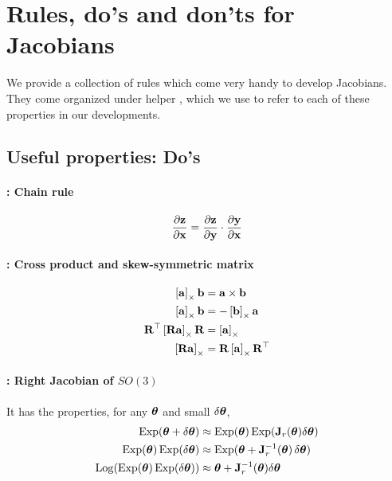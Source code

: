 \newpage
\section{Rules, do's and don'ts for Jacobians}
\label{sec:DosDonts}

We provide a collection of rules which come very handy to develop Jacobians. They come organized under helper \!\!\!\!, which we use to refer to each of these properties in our developments.

\subsection{Useful properties: Do's}

\paragraph{\cchain : Chain rule}

\begin{align}
\frac{\partial{\bf z}}{\partial{\bf x}} = \frac{\partial{\bf z}}{\partial{\bf y}}\cdot\frac{\partial{\bf y}}{\partial{\bf x}}
\end{align}

\paragraph{\ccross : Cross product and skew-symmetric matrix}

\begin{align}
\left[{\bf a}\right]_\times{\bf b} &= {\bf a}\times{\bf b} \\
\left[{\bf a}\right]_\times{\bf b} &= -\left[{\bf b}\right]_\times{\bf a} \\
{\bf R}^{\top}\left[{\bf R}{\bf a}\right]_\times{\bf R} &= \left[{\bf a}\right]_\times \\
\left[{\bf R}{\bf a}\right]_\times &= {\bf R}\left[{\bf a}\right]_\times{\bf R}^{\top} 
\end{align}

\paragraph{\cJr : Right Jacobian of $SO(3)$ }

It has the properties, for any ${{\bm \theta}}$ and small ${\delta{{\bm \theta}}}$,
%
\begin{align}
\Exp(\bth+\dth) &\approx \Exp(\bth)\Exp(\bfJ_r(\bth)\dth) \\
\Exp(\bth)\Exp(\dth) &\approx \Exp(\bth+\bfJ_r\inv(\bth)\,\dth) \\
\Log(\Exp(\bth)\Exp(\dth)) &\approx \bth+\bfJ_r\inv(\bth)\dth %
\end{align}
%






